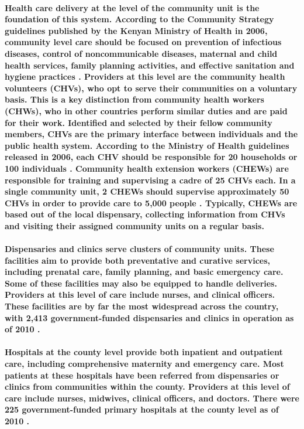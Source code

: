 \paragraph{Health care delivery at the level of the community unit is the foundation of this system. According to the Community Strategy guidelines published by the Kenyan Ministry of Health in 2006, community level care should be focused on prevention of infectious diseases, control of noncommunicable diseases, maternal and child health services, family planning activities, and effective sanitation and hygiene practices \citep{CommunityStrategy2006}. Providers at this level are the community  health volunteers (CHVs), who opt to serve their communities on a voluntary basis. This is a key distinction from community health workers (CHWs), who in other countries perform similar duties and are paid for their work.  Identified and selected by their fellow community members, CHVs are the primary interface between individuals and the public health system. According to the Ministry of Health guidelines released in 2006, each CHV should be responsible for 20 households or 100 individuals \citep{CommunityStrategy2006}. Community health extension workers (CHEWs) are responsible for training and supervising a cadre of 25 CHVs each. In a single community unit, 2 CHEWs should supervise approximately 50 CHVs in order to provide care to 5,000 people \citep{CommunityStrategy2006}. Typically, CHEWs are based out of the local dispensary, collecting information from CHVs and visiting their assigned community units on a regular basis.}

\paragraph{Dispensaries and clinics serve clusters of community units. These facilities aim to provide both preventative and curative services, including prenatal care, family planning, and basic emergency care. Some of these facilities may also be equipped to handle deliveries. Providers at this level of care include nurses, and clinical officers.  These facilities are by far the most widespread across the country, with 2,413 government-funded dispensaries and clinics in operation as of 2010 \citep{SPA2010}.}

\paragraph{Hospitals at the county level provide both inpatient and outpatient care, including comprehensive maternity and emergency care. Most patients at these hospitals have been referred from dispensaries or clinics from communities within the county. Providers at this level of care include nurses, midwives, clinical officers, and doctors. There were 225 government-funded primary hospitals at the county level as of 2010 \citep{SPA2010}.}

